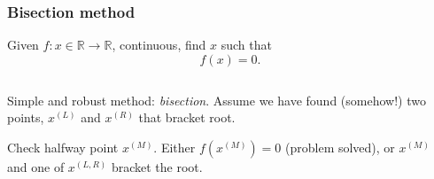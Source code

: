 \documentclass{beamer}
\begin{document}
\begin{frame}
  \frametitle{Bisection method}

  Given $f: x \in \mathbb{R} \to \mathbb{R}$, continuous, find $x$ such that
  \begin{equation*}
    f(x) = 0.
  \end{equation*}

  \vspace{2ex}

  \begin{columns}
    \begin{column}{0.5\textwidth}
      Simple and robust method: \emph{bisection}. Assume we have found (somehow!) two points, $x^{(L)}$ and $x^{(R)}$ that bracket root. \pause

      \vspace{0.5ex}

      Check halfway point $x^{(M)}$. Either $f(x^{(M)})=0$ (problem solved), or $x^{(M)}$ and one of $x^{(L,R)}$ bracket the root. \pause

      \vspace{0.5ex}


\end{column}
\end{columns}
\end{frame}
\end{document}
